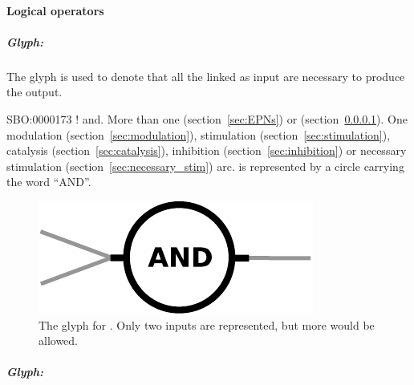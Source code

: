 
\paragraph{Logical operators}\label{sec:logic}

\subparagraph{Glyph: }\label{sec:and}

The glyph  is used to denote that all the  linked as input are necessary to produce the output.  

\begin{glyphDescription}
 \glyphSboTerm SBO:0000173 ! and.
 \glyphOrigin More than one  (section~\ref{sec:EPNs}) or  (section~\ref{sec:logic}).
 \glyphTarget  One modulation (section~\ref{sec:modulation}), stimulation (section~\ref{sec:stimulation}), catalysis (section~\ref{sec:catalysis}), inhibition (section~\ref{sec:inhibition}) or necessary stimulation (section~\ref{sec:necessary_stim}) arc.
 \glyphNode {} is represented by a circle carrying the word ``AND''.
\end{glyphDescription}

\begin{figure}[H]
  \centering
  \includegraphics[scale = 0.5]{images/and}
  \caption{The \PD glyph for . Only two inputs are represented, but more would be allowed.}
  \label{fig:and}
\end{figure}


\subparagraph{Glyph: }\label{sec:or}

